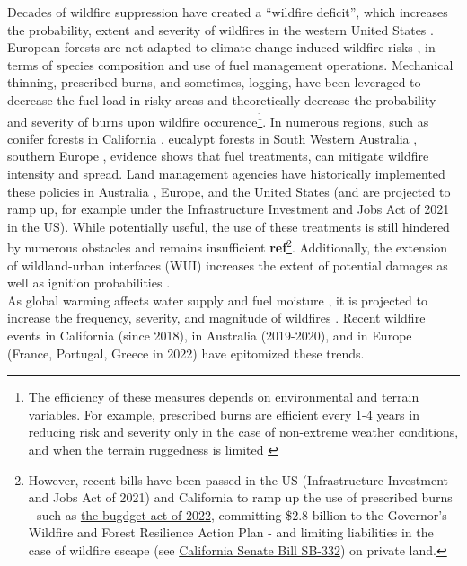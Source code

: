 Decades of wildfire suppression have created a ``wildfire deficit'', which increases the probability, extent and severity of wildfires in the western United States \citep{kreider_fire_2024}. European forests are not adapted to climate change induced wildfire risks \citep{Khabarov2014ForestFA}, in terms of species composition and use of fuel management operations. Mechanical thinning, prescribed burns, and sometimes, logging, have been leveraged to decrease the fuel load in risky areas and theoretically decrease the probability and severity of burns upon wildfire occurence\footnote{The efficiency of these measures depends on environmental and terrain variables. For example, prescribed burns are efficient every 1-4 years in reducing risk and severity only in the case of non-extreme weather conditions, and when the terrain ruggedness is limited \citep{bradstock_1998}}. In numerous regions, such as conifer forests in California \citep{Vaillant2009, Kalies2016, low_shaded_2023}, eucalypt forests in South Western Australia \citep{burrows2013, boer_long-term_2009, Florec2020}, southern Europe \citep{Fernandes2013}, evidence shows that fuel treatments, can mitigate wildfire intensity and spread. Land management agencies have historically implemented these policies in Australia \citep{burrows2013}, Europe, and the United States (and are projected to ramp up, for example under the Infrastructure Investment and Jobs Act of 2021 in the US). While potentially useful, the use of these treatments is still hindered by numerous obstacles \citep{miller_barriers_2020} and remains insufficient \textbf{ref}\footnote{However, recent bills have been passed in the US (Infrastructure Investment and Jobs Act of 2021) and California to ramp up the use of prescribed burns - such as \href{https://wildfiretaskforce.org/about/expenditure-plan/}{the bugdget act of 2022}, committing \$2.8 billion to the Governor’s Wildfire and Forest Resilience Action Plan - and limiting liabilities in the case of wildfire escape (see \href{https://openstates.org/ca/bills/20212022/SB332/}{California Senate Bill SB-332}) on private land.}. 
Additionally, the extension of wildland-urban interfaces (WUI) increases the extent of potential damages as well as ignition probabilities \citep{radeloff_rapid_2018}.
\\
As global warming affects water supply and fuel moisture \citep{jolly_climate-induced_2015, Abatzoglou, ruffault_extreme_2018}, it is projected to increase the frequency, severity, and magnitude of wildfires \citep{Dupuy2019ClimateCI, wasserman_climate_2023}. Recent wildfire events in California (since 2018), in Australia (2019-2020), and in Europe (France, Portugal, Greece in 2022) have epitomized these trends. 
